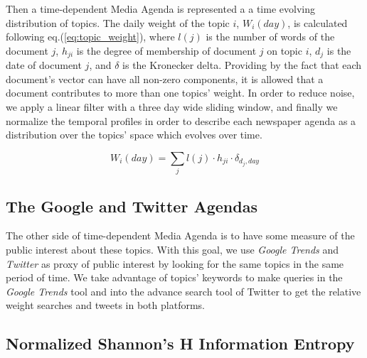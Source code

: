 \documentclass{bmcart}
\begin{document}
\par Then  a  time-dependent Media Agenda is represented a a time evolving distribution of topics. The daily weight of the topic $i$, $W_i(day)$, is calculated following  eq.(\ref{eq:topic_weight}), where $l(j)$ is the number of words of the document $j$, $h_{ji}$ is the degree of membership of document $j$ on topic $i$, $d_j$ is the date of document $j$, and $\delta$ is the Kronecker delta. Providing by the fact that each document's vector can have all non-zero components, it is allowed that a document contributes to more than one topics' weight.
In order to reduce noise, we apply a linear filter with a three day wide sliding window, and finally we normalize the temporal profiles in order to describe each newspaper agenda as a distribution over the topics' space which evolves over time. 

\begin{equation}
W_i(day) = \sum_j l(j) \cdot h_{ji} \cdot \delta_{d_j,day}
\label{eq:topic_weight}
\end{equation}

\subsection*{The Google and Twitter Agendas}
 
\par The other side of time-dependent Media Agenda is to have some measure of the public interest about these topics. With this goal, we use  \emph{Google Trends} and \emph{Twitter} as proxy of public interest by  looking for the same topics  in the same period of time. We take advantage of topics' keywords to make queries in the \emph{Google Trends}  tool and  into the advance search tool of Twitter  to get the relative weight searches and tweets in both platforms.

\subsection*{Normalized Shannon's H Information Entropy}
\end{document}
